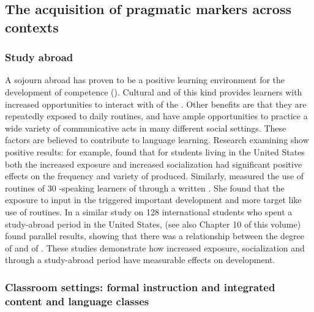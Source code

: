 \documentclass[output=paper]{langsci/langscibook}
\begin{document}
\subsection{The acquisition of pragmatic markers across contexts}
\subsubsection{Study abroad}

A sojourn abroad has proven to be a positive learning environment for the development of  competence (\citealt{Barron2003,Schauer2006}). Cultural and   of this kind provides learners with increased opportunities to interact with  of the . Other benefits are that they are repeatedly exposed to daily routines, and have ample opportunities to practice a wide variety of communicative acts in many different social settings. These factors are believed to contribute to language learning. Research examining  show positive results: for example, \citet{Liu2013,Liu2016} found that for  students living in the United States both the increased exposure and increased socialization had significant positive effects on the frequency and variety of  produced. Similarly, \citet{Barron2003} measured the use of  routines of 30 -speaking learners of  through a written . She found that the exposure to input in the  triggered important  development and more target like use of  routines. In a similar study on 128 international students who spent a study-abroad period in the United States, \cite{Sánchez-Hernández2016} (see also Chapter 10 of this volume) found parallel results, showing that there was a relationship between the degree of  and  of . These studies demonstrate how increased exposure, socialization and  through a study-abroad period have measurable effects on  development.


\subsubsection{Classroom settings: formal instruction and integrated content and language classes}
\end{document}
